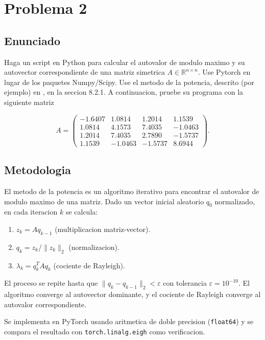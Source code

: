 \documentclass{article}
\begin{document}
\section{Problema 2}

\subsection{Enunciado}

Haga un script en Python para calcular el autovalor de modulo maximo y su autovector correspondiente de una matriz simetrica $A \in \mathbb{R}^{n\times n}$. Use Pytorch en lugar de los paquetes Numpy/Scipy. Use el metodo de la potencia, descrito (por ejemplo) en \cite{golub1996matrix}, en la seccion 8.2.1. A continuacion, pruebe su programa con la siguiente matriz

\[
A = \left(
\begin{array}{rrrr}
-1.6407 & 1.0814 & 1.2014 & 1.1539 \\
1.0814 & 4.1573 & 7.4035 & -1.0463 \\
1.2014 & 7.4035 & 2.7890 & -1.5737 \\
1.1539 & -1.0463 & -1.5737 & 8.6944
\end{array}
\right).
\]

\subsection{Metodologia}

El metodo de la potencia es un algoritmo iterativo para encontrar el autovalor de modulo maximo de una matriz. Dado un vector inicial aleatorio $q_0$ normalizado, en cada iteracion $k$ se calcula:
\begin{enumerate}
    \item $z_k = A q_{k-1}$ (multiplicacion matriz-vector).
    \item $q_k = z_k / \|z_k\|_2$ (normalizacion).
    \item $\lambda_k = q_k^T A q_k$ (cociente de Rayleigh).
\end{enumerate}

El proceso se repite hasta que $\|q_k - q_{k-1}\|_2 < \varepsilon$ con tolerancia $\varepsilon = 10^{-10}$. El algoritmo converge al autovector dominante, y el cociente de Rayleigh converge al autovalor correspondiente.

Se implementa en PyTorch usando aritmetica de doble precision (\texttt{float64}) y se compara el resultado con \texttt{torch.linalg.eigh} como verificacion.
\end{document}
